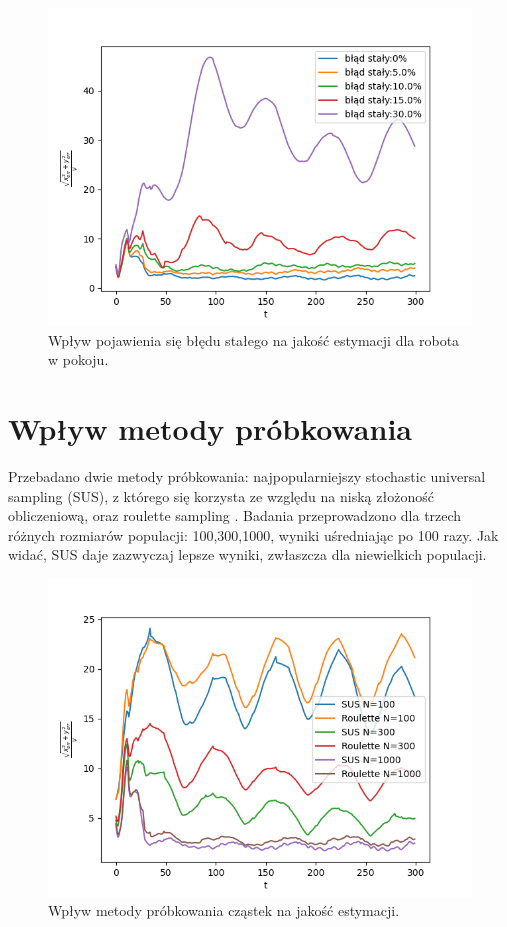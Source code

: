\begin{figure}[H]
	\begin{center}
		\includegraphics[width=12cm]{./blad_staly.png}
		\caption{Wpływ pojawienia się błędu stałego na jakość estymacji dla robota w pokoju.}
		\label{blad_staly}
	\end{center}
\end{figure}

\section{Wpływ metody próbkowania}
Przebadano dwie metody próbkowania: najpopularniejszy stochastic universal sampling \cite{sus_wiki} (SUS), z którego się korzysta ze względu na niską złożoność obliczeniową, oraz roulette sampling \cite{rou_wiki}. Badania przeprowadzono dla trzech różnych rozmiarów populacji: 100,300,1000, wyniki uśredniając po 100 razy. Jak widać, SUS daje zazwyczaj lepsze wyniki, zwłaszcza dla niewielkich populacji. 

\begin{figure}[H]
	\begin{center}
		\includegraphics[width=12cm]{./sampling_impact.png}
		\caption{Wpływ metody próbkowania cząstek na jakość estymacji.}
		\label{sampling_impact}
	\end{center}
\end{figure}


